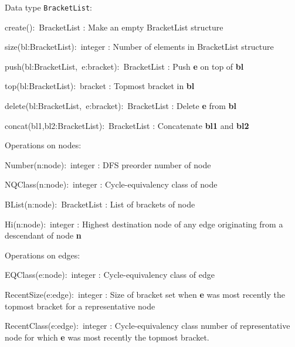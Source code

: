 Data type \texttt{BracketList}:
\begin{tightdesc}
\item[create():~BracketList]
:	Make an empty BracketList structure
\item[size(bl:BracketList):~integer]
:	Number of elements in BracketList structure
\item[push(bl:BracketList,~e:bracket):~BracketList]
:	Push \textbf{e} on top of \textbf{bl}
\item[top(bl:BracketList):~bracket]
:	Topmost bracket in \textbf{bl}
\item[delete(bl:BracketList,~e:bracket):~BracketList]
:	Delete \textbf{e} from \textbf{bl}
\item[concat(bl1,bl2:BracketList):~BracketList]
:	Concatenate \textbf{bl1} and \textbf{bl2}
\end{tightdesc}

Operations on nodes:
\begin{tightdesc}
\item[Number(n:node):~integer]
:	DFS preorder number of node
\item[NQClass(n:node):~integer]
:	Cycle-equivalency class of node
\item[BList(n:node):~BracketList]
:	List of brackets of node
\item[Hi(n:node):~integer]
:	Highest destination node of any edge originating from a
	descendant of node \textbf{n}
\end{tightdesc}

Operations on edges:
\begin{tightdesc}
\item[EQClass(e:node):~integer]
:	Cycle-equivalency class of edge
\item[RecentSize(e:edge):~integer]
:	Size of bracket set when \textbf{e} was most recently the
	topmost bracket for a representative node
\item[RecentClass(e:edge):~integer]
:	Cycle-equivalency class number of representative node for
	which \textbf{e} was most recently the topmost bracket.
\end{tightdesc}
